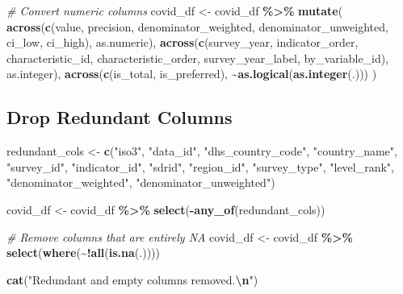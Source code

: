 \documentclass[
]{article}
\newenvironment{Shaded}{\begin{snugshade}}{\end{snugshade}}
\newcommand{\CommentTok}[1]{\textcolor[rgb]{0.56,0.35,0.01}{\textit{#1}}}
\newcommand{\FunctionTok}[1]{\textcolor[rgb]{0.13,0.29,0.53}{\textbf{#1}}}
\newcommand{\NormalTok}[1]{#1}
\newcommand{\OtherTok}[1]{\textcolor[rgb]{0.56,0.35,0.01}{#1}}
\newcommand{\SpecialCharTok}[1]{\textcolor[rgb]{0.81,0.36,0.00}{\textbf{#1}}}
\newcommand{\StringTok}[1]{\textcolor[rgb]{0.31,0.60,0.02}{#1}}
\begin{document}
\begin{Shaded}
\begin{Highlighting}[]
\CommentTok{\# Convert numeric columns}
\NormalTok{covid\_df }\OtherTok{\textless{}{-}}\NormalTok{ covid\_df }\SpecialCharTok{\%\textgreater{}\%}
  \FunctionTok{mutate}\NormalTok{(}
    \FunctionTok{across}\NormalTok{(}\FunctionTok{c}\NormalTok{(value, precision, denominator\_weighted, denominator\_unweighted, ci\_low, ci\_high), as.numeric),}
    \FunctionTok{across}\NormalTok{(}\FunctionTok{c}\NormalTok{(survey\_year, indicator\_order, characteristic\_id, characteristic\_order, survey\_year\_label, by\_variable\_id), as.integer),}
    \FunctionTok{across}\NormalTok{(}\FunctionTok{c}\NormalTok{(is\_total, is\_preferred), }\SpecialCharTok{\textasciitilde{}}\FunctionTok{as.logical}\NormalTok{(}\FunctionTok{as.integer}\NormalTok{(.)))}
\NormalTok{  )}
\end{Highlighting}
\end{Shaded}

\subsection{Drop Redundant Columns}\label{drop-redundant-columns}

\begin{Shaded}
\begin{Highlighting}[]
\NormalTok{redundant\_cols }\OtherTok{\textless{}{-}} \FunctionTok{c}\NormalTok{(}\StringTok{"iso3"}\NormalTok{, }\StringTok{"data\_id"}\NormalTok{, }\StringTok{"dhs\_country\_code"}\NormalTok{, }\StringTok{"country\_name"}\NormalTok{, }
                    \StringTok{"survey\_id"}\NormalTok{, }\StringTok{"indicator\_id"}\NormalTok{, }\StringTok{"sdrid"}\NormalTok{, }\StringTok{"region\_id"}\NormalTok{, }
                    \StringTok{"survey\_type"}\NormalTok{, }\StringTok{"level\_rank"}\NormalTok{, }\StringTok{"denominator\_weighted"}\NormalTok{, }\StringTok{"denominator\_unweighted"}\NormalTok{)}

\NormalTok{covid\_df }\OtherTok{\textless{}{-}}\NormalTok{ covid\_df }\SpecialCharTok{\%\textgreater{}\%} \FunctionTok{select}\NormalTok{(}\SpecialCharTok{{-}}\FunctionTok{any\_of}\NormalTok{(redundant\_cols))}

\CommentTok{\# Remove columns that are entirely NA}
\NormalTok{covid\_df }\OtherTok{\textless{}{-}}\NormalTok{ covid\_df }\SpecialCharTok{\%\textgreater{}\%} \FunctionTok{select}\NormalTok{(}\FunctionTok{where}\NormalTok{(}\SpecialCharTok{\textasciitilde{}!}\FunctionTok{all}\NormalTok{(}\FunctionTok{is.na}\NormalTok{(.))))}

\FunctionTok{cat}\NormalTok{(}\StringTok{"Redundant and empty columns removed.}\SpecialCharTok{\textbackslash{}n}\StringTok{"}\NormalTok{)}
\end{Highlighting}
\end{Shaded}
\end{document}
